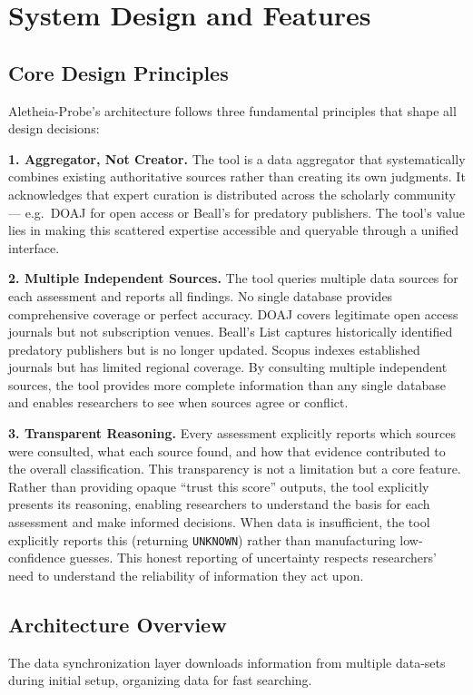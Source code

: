 \documentclass[fleqn,10pt]{SelfArx}
\begin{document}
\section{System Design and Features}

\subsection{Core Design Principles}
Aletheia-Probe's architecture follows three fundamental principles that
shape all design decisions:

\textbf{1. Aggregator, Not Creator.} The tool is a data aggregator
that systematically combines existing authoritative sources rather
than creating its own judgments. It acknowledges that expert curation
is distributed across the scholarly community --- e.g.~DOAJ for open
access or Beall's for predatory publishers. The tool's value lies in
making this scattered expertise accessible and queryable through a
unified interface.

\textbf{2. Multiple Independent Sources.} The tool queries multiple
data sources for each assessment and reports all findings. No single
database provides comprehensive coverage or perfect accuracy. DOAJ
covers legitimate open access journals but not subscription venues.
Beall's List captures historically identified predatory publishers but
is no longer updated. Scopus indexes established journals but has
limited regional coverage. By consulting multiple independent sources,
the tool provides more complete information than any single database
and enables researchers to see when sources agree or conflict.

\textbf{3. Transparent Reasoning.} Every assessment explicitly reports
which sources were consulted, what each source found, and how that
evidence contributed to the overall classification. This transparency
is not a limitation but a core feature. Rather than providing opaque
``trust this score'' outputs, the tool explicitly presents its reasoning,
enabling researchers to understand the basis for each assessment and
make informed decisions. When data is insufficient, the tool explicitly
reports this (returning \texttt{UNKNOWN}) rather than manufacturing
low-confidence guesses. This honest reporting of uncertainty respects
researchers' need to understand the reliability of information they act
upon.

\subsection{Architecture Overview}
The data synchronization
layer downloads information from multiple data-sets during initial
setup, organizing data for fast searching.
\end{document}
